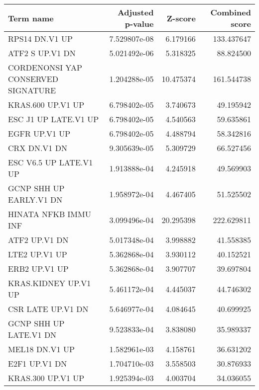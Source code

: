 \begin{tabular}{lrrr}
\toprule
                         Term name &  Adjusted p-value &   Z-score &  Combined score \\
\midrule
                    RPS14 DN.V1 UP &      7.529807e-08 &  6.179166 &      133.437647 \\
                   ATF2 S UP.V1 DN &      5.021492e-06 &  5.318325 &       88.824500 \\
CORDENONSI YAP CONSERVED SIGNATURE &      1.204288e-05 & 10.475374 &      161.544738 \\
                 KRAS.600 UP.V1 UP &      6.798402e-05 &  3.740673 &       49.195942 \\
              ESC J1 UP LATE.V1 UP &      6.798402e-05 &  4.540563 &       59.635861 \\
                     EGFR UP.V1 UP &      6.798402e-05 &  4.488794 &       58.342816 \\
                      CRX DN.V1 DN &      9.305639e-05 &  5.309729 &       66.527456 \\
            ESC V6.5 UP LATE.V1 UP &      1.913888e-04 &  4.245918 &       49.569903 \\
           GCNP SHH UP EARLY.V1 DN &      1.958972e-04 &  4.467405 &       51.525502 \\
              HINATA NFKB IMMU INF &      3.099496e-04 & 20.295398 &      222.629811 \\
                     ATF2 UP.V1 DN &      5.017348e-04 &  3.998882 &       41.558385 \\
                     LTE2 UP.V1 UP &      5.362868e-04 &  3.930112 &       40.152521 \\
                     ERB2 UP.V1 UP &      5.362868e-04 &  3.907707 &       39.697804 \\
              KRAS.KIDNEY UP.V1 UP &      5.461172e-04 &  4.445037 &       44.746302 \\
                 CSR LATE UP.V1 DN &      5.646977e-04 &  4.084645 &       40.699925 \\
            GCNP SHH UP LATE.V1 DN &      9.523833e-04 &  3.838080 &       35.989337 \\
                    MEL18 DN.V1 UP &      1.582961e-03 &  4.158761 &       36.631202 \\
                     E2F1 UP.V1 DN &      1.704710e-03 &  3.558503 &       30.876933 \\
                 KRAS.300 UP.V1 UP &      1.925394e-03 &  4.003704 &       34.036055 \\

\end{tabular}
